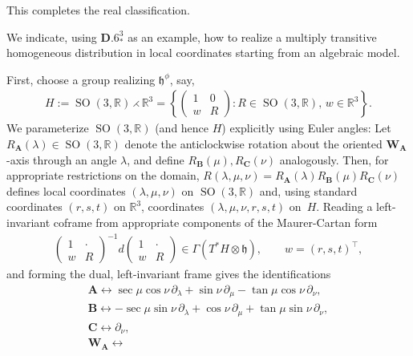 \documentclass[10pt,a4paper]{amsart}
\DeclareMathOperator{\SO} {SO}
\newcommand{\bbR}{\mathbb{R}}
\newcommand{\mbA}{\mathbf{A}}
\newcommand{\mbB}{\mathbf{B}}
\newcommand{\mbC}{\mathbf{C}}
\newcommand{\mbW}{\mathbf{W}}
\newcommand{\mfh} {\mathfrak{h}}
\numberwithin{equation}{section}
\begin{document}
This completes the real classification.

\begin{Example}\label{example:D.6-ast-coordinates}
We indicate, using $\mathbf{D.6}_{\ast}^3$ as an example, how to realize a multiply transitive homogeneous distribution in local coordinates starting from an algebraic model.

First, choose a group realizing $\mfh^{\phi}$, say,
\begin{gather*}
	H
		:= \SO(3, \bbR) \rightthreetimes \bbR^3
		=
	\left\{
		\begin{pmatrix}
			1 & 0 \\
			w & R
		\end{pmatrix}
	\colon
		R \in \SO(3, \bbR),\, w \in \bbR^3
	\right\} .
\end{gather*}
We parameterize $\SO(3, \bbR)$ (and hence $H$) explicitly using Euler angles: Let $R_{\mbA}(\lambda) \in \SO(3, \bbR)$ denote the anticlockwise rotation about the oriented $\mbW_{\mbA}$-axis through an angle $\lambda$, and define $R_{\mbB}(\mu), R_{\mbC}(\nu)$ analogously. Then, for appropriate restrictions on the domain, $R(\lambda, \mu, \nu) = R_{\mbA}(\lambda) R_{\mbB}(\mu) R_{\mbC}(\nu)$ defines local coordinates $(\lambda, \mu, \nu)$ on $\SO(3, \bbR)$ and, using standard coordinates $(r, s, t)$ on $\bbR^3$, coordinates $(\lambda, \mu, \nu, r, s, t)$ on~$H$. Reading a left-invariant coframe from appropriate components of the Maurer-Cartan form
\begin{gather*}
	\begin{pmatrix}
		1 & \cdot \\
		w & R
	\end{pmatrix}^{-1}
	d
	\begin{pmatrix}
		1 & \cdot \\
		w & R
	\end{pmatrix}
 \in \Gamma(T^*H \otimes \mfh),
 \qquad w = (r, s, t)^{\top} ,
\end{gather*}
and forming the dual, left-invariant frame gives the identifications
\begin{gather*}
	\mbA\leftrightarrow
		\sec \mu \cos \nu \,\partial_{\lambda}
			+ \sin \nu \, \partial_{\mu}
			- \tan \mu \cos \nu \,\partial_{\nu} , \\
	\mbB\leftrightarrow
		-\sec \mu \sin \nu \,\partial_{\lambda}
			+ \cos \nu \,\partial_{\mu}
			+ \tan \mu \sin \nu \,\partial_{\nu} , \\
	\mbC\leftrightarrow
		\partial_{\nu} , \\
	\mbW_{\mbA}\leftrightarrow

\end{gather*}
\end{Example}
\end{document}
